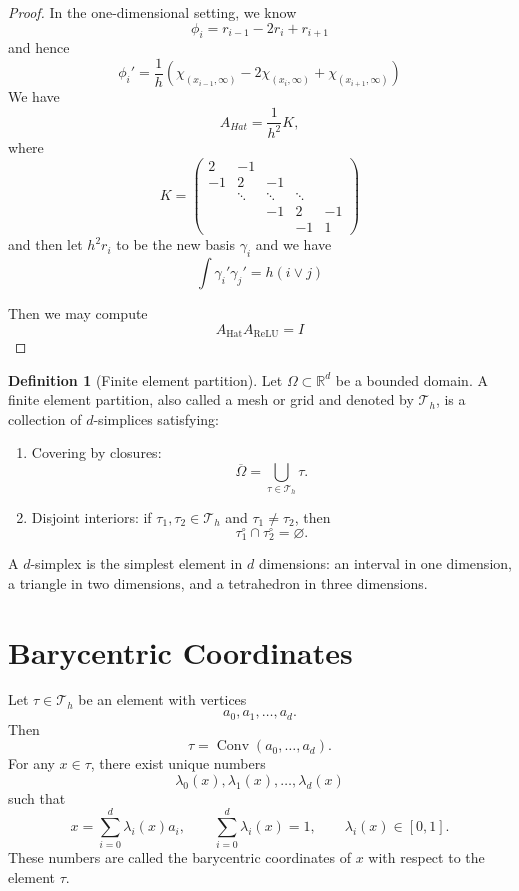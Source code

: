 \documentclass[11pt,a4paper]{article}
\newcommand{\R}{\mathbb{R}}
\newcommand{\Conv}{\operatorname{Conv}}
\newcommand{\Th}{\mathcal{T}_h}
\theoremstyle{definition}
\newtheorem{definition}{Definition}[section]
\theoremstyle{plain}
\theoremstyle{remark}
\theoremstyle{plain}
\begin{document}
\begin{proof}
    In the one-dimensional setting, we know
    \[\phi_i = r_{i-1} - 2r_i + r_{i+1}\]
    and hence
    \[
        \phi_i ' = \dfrac{1}{h}(\chi_{(x_{i-1},\infty)} - 2\chi_{(x_i,\infty)}+\chi_{(x_{i+1},\infty)})
    \]
    We have
    \[
    A_{Hat}=\frac1{h^2} K,
    \]
    where
    \[
    K=
    \begin{pmatrix}
    2 & -1 \\
    -1 & 2 & -1 \\
    & \ddots & \ddots & \ddots \\
    && -1 & 2 & -1 \\
    &&& -1 & 1 \end{pmatrix}
\]
and then let $h^2 r_i$ to be the new basis $\gamma_i$ and we have 
\[
\int \gamma_i'\gamma_j' = h(i\vee j)
\]

Then we may compute
\[
A_{\text{Hat}}A_{\text{ReLU}} = I
\]
\end{proof}

\begin{definition}[Finite element partition]
Let $\Omega\subset \R^d$ be a bounded domain. A finite element partition, also called a mesh or grid and denoted by $\Th$, is a collection of $d$-simplices satisfying:
\begin{enumerate}
  \item Covering by closures:
  \[
    \overline{\Omega}=\bigcup_{\tau\in\Th}\tau.
  \]
  \item Disjoint interiors: if $\tau_1,\tau_2\in\Th$ and $\tau_1\ne \tau_2$, then
  \[
    \tau_1^\circ\cap \tau_2^\circ=\varnothing.
  \]
\end{enumerate}
\end{definition}

A $d$-simplex is the simplest element in $d$ dimensions: an interval in one dimension, a triangle in two dimensions, and a tetrahedron in three dimensions.

\section{Barycentric Coordinates}

Let $\tau\in\Th$ be an element with vertices
\[
  a_0,a_1,\ldots,a_d.
\]
Then
\[
  \tau=\Conv(a_0,\ldots,a_d).
\]
For any $x\in\tau$, there exist unique numbers
\[
  \lambda_0(x),\lambda_1(x),\ldots,\lambda_d(x)
\]
such that
\[
  x=\sum_{i=0}^d \lambda_i(x)a_i,
  \qquad
  \sum_{i=0}^d \lambda_i(x)=1,
  \qquad
  \lambda_i(x)\in[0,1].
\]
These numbers are called the barycentric coordinates of $x$ with respect to the element $\tau$.
\end{document}
